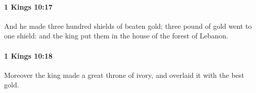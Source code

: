 		\paragraph{1 Kings 10:17} %
			\label{1KINGS-10-17}

			And he made three hundred shields of beaten gold; three pound of gold went to one shield: and the king put them in the house of the forest of Lebanon.


		\paragraph{1 Kings 10:18} %
			\label{1KINGS-10-18}

			Moreover the king made a great throne of ivory, and overlaid it with the best gold.


